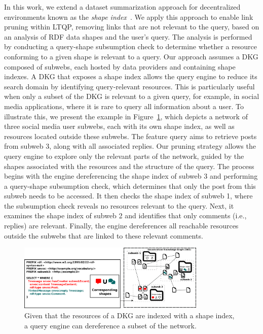 In this work, we extend a dataset summarization approach for decentralized environments known as the \emph{shape index}~\cite{tam2024opportunitiesshapebasedoptimizationlink}.
We apply this approach to enable link pruning within LTQP, removing links that are not relevant to the query, based on an analysis of RDF data shapes and the user's query.
The analysis is performed by conducting a query-shape subsumption check to determine whether a resource conforming to a given shape is relevant to a query.
Our approach assumes a DKG composed of subwebs, each hosted by data providers and containing shape indexes.
A DKG that exposes a shape index allows the query engine to reduce its search domain by identifying query-relevant resources.
This is particularly useful when only a subset of the DKG is relevant to a given query, for example, in social media applications, where it is rare to query all information about a user.
To illustrate this, we present the example in Figure~\ref{fig:dkg}, which depicts a network of three social media user subwebs, each with its own shape index, as well as resources located outside these subwebs.
The feature query aims to retrieve posts from subweb 3, along with all associated replies.
Our pruning strategy allows the query engine to explore only the relevant parts of the network, guided by the shapes associated with the resources and the structure of the query.
The process begins with the engine dereferencing the shape index of subweb 3 and performing a query-shape subsumption check, which determines that only the post from this subweb needs to be accessed.  
It then checks the shape index of subweb 1, where the subsumption check reveals no resources relevant to the query.  
Next, it examines the shape index of subweb 2 and identifies that only comments (i.e., replies) are relevant.  
Finally, the engine dereferences all reachable resources outside the subwebs that are linked to these relevant comments.

\begin{figure}
   \centering
   \includegraphics[width=0.80\textwidth]{figure/dkg.png}
   \caption{
      Given that the resources of a DKG are indexed with a shape index, a query engine can dereference a subset of the network.
    }
    \label{fig:dkg}
\end{figure}

